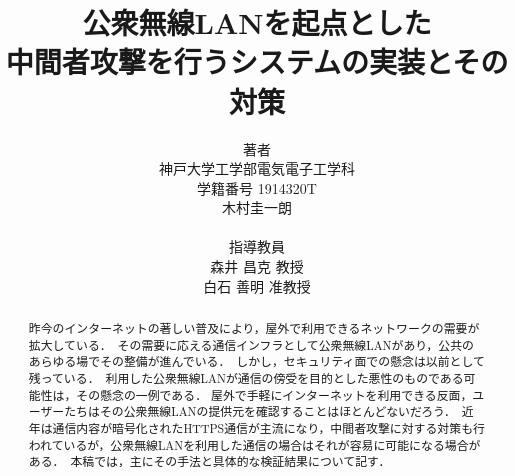\documentclass[dvipdfmx]{jsarticle}
\title{公衆無線LANを起点とした\\中間者攻撃を行うシステムの実装とその対策}
\author{
    著者\\
    神戸大学工学部電気電子工学科\\
    学籍番号 1914320T\\
    木村圭一朗\\
    \\
    指導教員\\
    森井 昌克 教授\\
    白石 善明 准教授\\
}
\begin{document}
    \maketitle
    \begin{abstract}
        昨今のインターネットの著しい普及により，屋外で利用できるネットワークの需要が拡大している．\
        その需要に応える通信インフラとして公衆無線LANがあり，公共のあらゆる場でその整備が進んでいる．\
        しかし，セキュリティ面での懸念は以前として残っている．\
        利用した公衆無線LANが通信の傍受を目的とした悪性のものである可能性は，その懸念の一例である．
        屋外で手軽にインターネットを利用できる反面，ユーザーたちはその公衆無線LANの提供元を確認することはほとんどないだろう．\
        近年は通信内容が暗号化されたHTTPS通信が主流になり，中間者攻撃に対する対策も行われているが，公衆無線LANを利用した通信の場合はそれが容易に可能になる場合がある．\
        本稿では，主にその手法と具体的な検証結果について記す．
        \newline
    \end{abstract}
    \tableofcontents
    \clearpage
\end{document}
